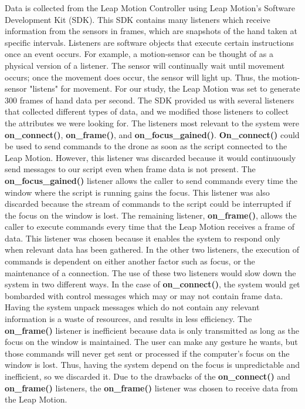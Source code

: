 \documentclass[letterpaper,english, 12pt]{article}
\begin{document}
Data is collected from the Leap Motion Controller using Leap Motion's Software Development Kit (SDK). This SDK contains many listeners which receive information from the sensors in frames, which are snapshots of the hand taken at specific intervals. Listeners are software objects that execute certain instructions once an event occurs. For example, a motion-sensor can be thought of as a physical version of a listener. The sensor will continually wait until movement occurs; once the movement does occur, the sensor will light up. Thus, the motion-sensor "listens" for movement. For our study, the Leap Motion was set to generate 300 frames of hand data per second. The SDK provided us with several listeners that collected different types of data, and we modified those listeners to collect the attributes we were looking for. The listeners most relevant to the system were  \textbf{on\_connect()}, \textbf{on\_frame()}, and \textbf{on\_focus\_gained()}. \textbf{On\_connect()} could be used to send commands to the drone as soon as the script connected to the Leap Motion. However, this listener was discarded because it would continuously send messages to our script even when frame data is not present. The \textbf{on\_focus\_gained()} listener allows the caller to send commands every time the window where the script is running gains the focus. This listener was also discarded because the stream of commands to the script could be interrupted if the focus on the window is lost. The remaining listener, \textbf{on\_frame()}, allows the caller to execute commands every time that the Leap Motion receives a frame of data. This listener was chosen because it enables the system to respond only when relevant data has been gathered. In the other two listeners,  the execution of commands is dependent on either another factor such as focus, or the maintenance of a connection. The use of these two listeners would slow down the system in two different ways. In the case of \textbf{on\_connect()}, the system would get bombarded with control messages which may or may not contain frame data. Having the system unpack messages which do not contain any relevant information is a waste of resources, and results in less efficiency. The \textbf{on\_frame()} listener is inefficient because data is only transmitted as long as the focus on the window is maintained. The user can make any gesture he wants, but those commands will never get sent or processed if the computer's focus on the window is lost. Thus, having the system depend on the focus is unpredictable and inefficient, so we discarded it. Due to the drawbacks of the \textbf{on\_connect()} and \textbf{on\_frame()} listeners, the \textbf{on\_frame()} listener was chosen to receive data from the Leap Motion.
\end{document}
